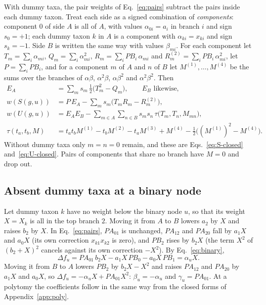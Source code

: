 \documentclass[11pt,a4paper]{article}
\begin{document}
With dummy taxa, the pair weights of Eq.~\eqref{eq:pairs} subtract the pairs inside each dummy
taxon. Treat each side as a signed combination of \emph{components}: component $0$ of side $A$ is all
of $A$, with values $\alpha_{0i}=a_i$ in branch $i$ and sign $s_0=+1$; each dummy taxon $k$ in $A$ is
a component with $\alpha_{ki}=x_{ki}$ and sign $s_k=-1$. Side $B$ is written the same way with values
$\beta_{mi}$. For each component let $T_m=\sum_i\alpha_{mi}$, $Q_m=\sum_i\alpha_{mi}^2$,
$R_m=\sum_iPB_i\,\alpha_{mi}$ and $R^{(2)}_m=\sum_iPB_i\,\alpha_{mi}^2$, let $P=\sum_iPB_i$, and for a
component $m$ of $A$ and $n$ of $B$ let $M^{(1)},\dots,M^{(4)}$ be the sums over the branches of
$\alpha\beta$, $\alpha^2\beta$, $\alpha\beta^2$ and $\alpha^2\beta^2$. Then
\begin{align}
  E_A &= \sum_m s_m\,\tfrac12\bigl(T_m^2-Q_m\bigr), \qquad E_B \text{ likewise},\\
  w(S(g,u)) &= P\,E_A - \sum_m s_m\bigl(T_mR_m - R^{(2)}_m\bigr),\\
  w(U(g,u)) &= E_AE_B - \sum_{m\in A}\sum_{n\in B} s_ms_n\,\tau\bigl(T_m,T_n,M_{mn}\bigr),\\
  \tau(t_a,t_b,M) &= t_at_bM^{(1)} - t_bM^{(2)} - t_aM^{(3)} + M^{(4)} - \tfrac12\bigl((M^{(1)})^2-M^{(4)}\bigr).
\end{align}
Without dummy taxa only $m=n=0$ remain, and these are Eqs.~\eqref{eq:S-closed}
and~\eqref{eq:U-closed}. Pairs of components that share no branch have $M=0$ and drop out.

\subsection{Absent dummy taxa at a binary node}\label{app:sparse}

Let dummy taxon $k$ have no weight below the binary node $u$, so that its weight $X=X_k$ is all in
the top branch $2$. Moving it from $A$ to $B$ lowers $a_2$ by $X$ and raises $b_2$ by $X$. In
Eq.~\eqref{eq:pairs}, $PA_{01}$ is unchanged, $PA_{12}$ and $PA_{20}$ fall by $a_1X$ and $a_0X$ (its own
correction $x_{k1}x_{k2}$ is zero), and $PB_2$ rises by $b_2X$ (the term $X^2$ of $(b_2+X)^2$ cancels
against its own correction $-X^2$). By Eq.~\eqref{eq:binary},
\[
  \Delta f_u = PA_{01}\,b_2X - a_1X\,PB_0 - a_0X\,PB_1 = \alpha_uX .
\]
Moving it from $B$ to $A$ lowers $PB_2$ by $b_2X-X^2$ and raises $PA_{12}$ and $PA_{20}$ by $a_1X$ and
$a_0X$, so $\Delta f_u=-\alpha_uX+PA_{01}X^2$: $\beta_u=-\alpha_u$ and $\gamma_u=PA_{01}$. At a
polytomy the coefficients follow in the same way from the closed forms of Appendix~\ref{app:poly}.
\end{document}
